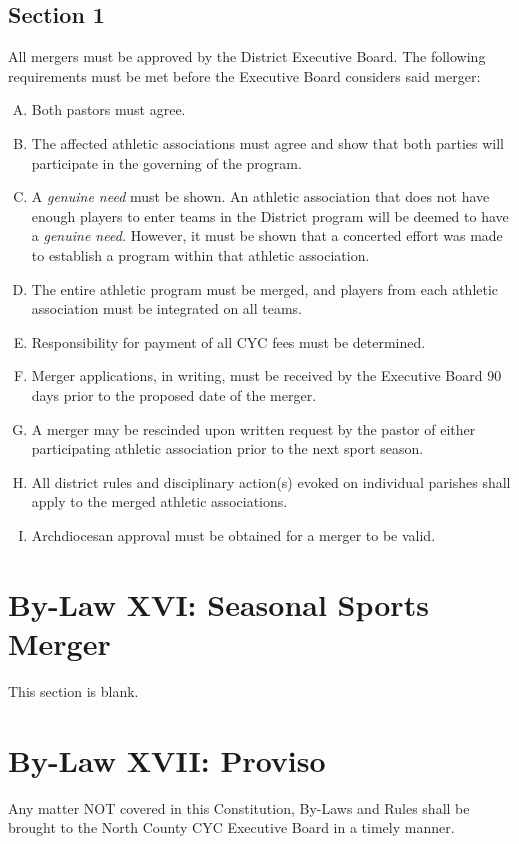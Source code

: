 \subsection{Section 1}
\label{ssec:bylaw-15-1}
All mergers must be approved by the District Executive Board. The following requirements must be met before the Executive Board considers said merger:
\begin{enumerate}[A.]
    \item Both pastors must agree.
    \item The affected athletic associations must agree and show that both parties will participate in the governing of the program.
    \item A {\em genuine need} must be shown.  An athletic association that does not have enough players to en­ter teams in the District program will be deemed to have a {\em genuine need.}   However, it must be shown that a concerted effort was made to establish a program within that athletic association.
    \item The entire athletic program must be merged, and players from each athletic association must be integrated on all teams.
    \item Responsibility for payment of all CYC fees must be determined.
    \item Merger applications, in writing, must be received by the Executive Board 90 days prior to the proposed date of the merger.
    \item A merger may be rescinded upon written request by the pastor of either partici­pating athletic association prior to the next sport season.
    \item All district rules and disciplinary action(s) evoked on individual parishes shall apply to the merged athletic associations.
    \item Archdiocesan approval must be obtained for a merger to be valid.
\end{enumerate}

\section{By-Law XVI: Seasonal Sports Merger}
\label{sec:bylaw-16}
This section is blank.

\section{By-Law XVII: Proviso}
\label{sec:bylaw-17}
Any matter NOT covered in this Constitution, By-Laws and Rules shall be brought to the North County CYC Executive Board in a timely manner. 
   


